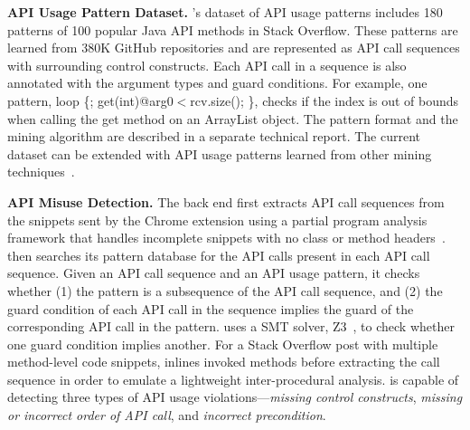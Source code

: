 \begin{table*}[!th]
{\begin{tabular}{|l|l|l|}
\end{tabular}
}
\caption{Description templates for different types of API usage violations. {\textless?\textgreater} and {\textless before/after\textgreater} are instantiated based on API usage violations and correct patterns. The digits in the last column are the Stack Overflow post ids where each example warning message is reported.}
\label{tab:template}
\end{table*}

{\bf API Usage Pattern Dataset.} {\tool}'s dataset of API usage patterns includes 180 patterns of 100 popular Java API methods in Stack Overflow. These patterns are learned from 380K GitHub repositories and are represented as API call sequences with surrounding control constructs. Each API call in a sequence is also annotated with the argument types and guard conditions. For example, one pattern, {\ttt loop \{; get(int)@arg0$<$rcv.size(); \}}, checks if the index is out of bounds when calling the {\ttt get} method on an {\ttt ArrayList} object. The pattern format and the mining algorithm are described in a separate technical report. The current dataset can be extended with API usage patterns learned from other mining techniques~\cite{gruska2010learning, wang2013mining, zhong2009mapo, Nguyen09}. 

{\bf API Misuse Detection.} The back end first extracts API call sequences from the snippets sent by the Chrome extension using a partial program analysis framework that handles incomplete snippets with no class or method headers~\cite{subramanian2014live}. {\tool} then searches its pattern database for the API calls present in each API call sequence. Given an API call sequence and an API usage pattern, it checks whether (1)  the pattern is a subsequence of the API call sequence, and (2) the guard condition of each API call in the sequence implies the guard of the corresponding API call in the pattern. {\tool} uses a SMT solver, Z3~\cite{de2008z3}, to check whether one guard condition implies another. For a Stack Overflow post with multiple method-level code snippets, {\tool} inlines invoked methods before extracting the call sequence in order to emulate a lightweight inter-procedural analysis. {\tool} is capable of detecting three types of API usage violations---{\em missing control constructs}, {\em missing or incorrect order of API call}, and {\em incorrect precondition}.


